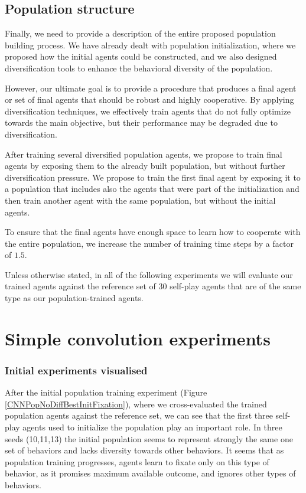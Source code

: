 \subsection{Population structure}
Finally, we need to provide a description of the entire proposed population building process.
We have already dealt with population initialization, where we proposed how the initial agents could be constructed, and we also designed diversification tools to enhance the behavioral diversity of the population.

However, our ultimate goal is to provide a procedure that produces a final agent or set of final agents that should be robust and highly cooperative.
By applying diversification techniques, we effectively train agents that do not fully optimize towards the main objective, but their performance may be degraded due to diversification.

After training several diversified population agents, we propose to train final agents by exposing them to the already built population, but without further diversification pressure.
We propose to train the first final agent by exposing it to a population that includes also the agents that were part of the initialization and then train another agent with the same population, but without the initial agents.

To ensure that the final agents have enough space to learn how to cooperate with the entire population, we increase the number of training time steps by a factor of $1.5$.

Unless otherwise stated, in all of the following experiments we will evaluate our trained agents against the reference set of 30 self-play agents that are of the same type as our population-trained agents.

\section{Simple convolution experiments}

\subsubsection{Initial experiments visualised}

After the initial population training experiment (Figure \ref{CNNPopNoDiffBestInitFixation}), where we cross-evaluated the trained population agents against the reference set, we can see that the first three self-play agents used to initialize the population play an important role.
In three seeds (10,11,13) the initial population seems to represent strongly the same one set of behaviors and lacks diversity towards other behaviors.
It seems that as population training progresses, agents learn to fixate only on this type of behavior, as it promises maximum available outcome, and ignores other types of behaviors.

